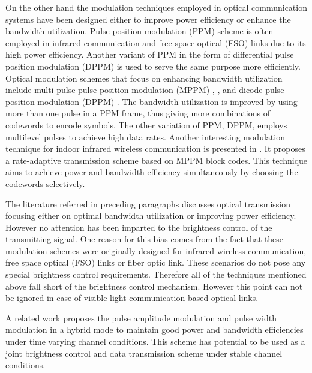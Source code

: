 On the other hand the modulation techniques employed in optical communication systems have been designed either to improve power efficiency or enhance the bandwidth utilization. Pulse position modulation (PPM) scheme is often employed in infrared communication and free space optical (FSO) links \cite{audeh1996performance} \cite{lesh1983capacity} due to its high power efficiency. Another variant of PPM in the form of differential pulse position modulation (DPPM) is used to serve the same purpose \cite{shiu1999differential} more efficiently. Optical modulation schemes that focus on enhancing bandwidth utilization include multi-pulse pulse position modulation (MPPM) \cite{kozawa2008enhancement}, \cite{xu2009coded}, \cite{sugiyama1989mppm} and dicode pulse position modulation (DPPM) \cite{sibley2003dicode}. The bandwidth utilization is improved by using more than one pulse in a PPM frame, thus giving more combinations of codewords to encode symbols. The other variation of PPM, DPPM, employs multilevel pulses to achieve high data rates. Another interesting modulation technique for indoor infrared wireless communication is presented in \cite{garrido2006variable}. It proposes a rate-adaptive transmission scheme based on MPPM block codes. This technique aims to achieve power  and bandwidth efficiency simultaneously by choosing the codewords selectively. 

The literature referred in preceding paragraphs discusses optical transmission focusing either on optimal bandwidth utilization or improving power efficiency. However no attention has been imparted to the brightness control of the transmitting signal. One reason for this bias comes from the fact that these modulation schemes were originally designed for infrared wireless communication, free space optical (FSO) links or fiber optic link. These scenarios do not pose any special brightness control requirements. Therefore all of the techniques mentioned above fall short of the brightness control mechanism. However this point can not be ignored in case of visible light communication based optical links.

A related work \cite{zeng2007tunable} proposes the pulse amplitude modulation and pulse width modulation in a hybrid mode to maintain good power and bandwidth efficiencies under time varying channel conditions. This scheme has potential to be used as a joint brightness control and data transmission scheme under stable channel conditions.

